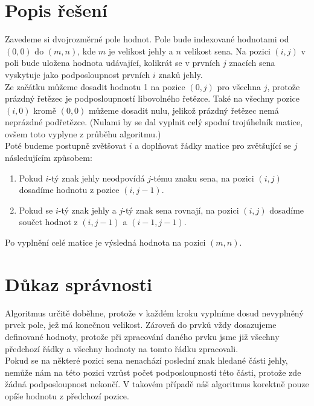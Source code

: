 \documentclass{scrartcl}
\begin{document}
    \section{Popis řešení}
    Zavedeme si dvojrozměrné pole hodnot. Pole bude indexované hodnotami od $(0, 0)$ do $(m, n)$, kde $m$ je velikost jehly a $n$ velikost sena. Na pozici $(i, j)$ v poli bude uložena hodnota udávající, kolikrát se v prvních $j$ znacích sena vyskytuje jako podposloupnost prvních $i$ znaků jehly. \\

    Ze začátku můžeme dosadit hodnotu 1 na pozice $(0, j)$ pro všechna $j$, protože prázdný řetězec je podposloupností libovolného řetězce. Také na všechny pozice $(i, 0)$ kromě $(0, 0)$ můžeme dosadit nulu, jelikož prázdný řetězec nemá neprázdné podřetězce. (Nulami by se dal vyplnit celý spodní trojúhelník matice, ovšem toto vyplyne z průběhu algoritmu.) \\

    Poté budeme postupně zvětšovat $i$ a doplňovat řádky matice pro zvětšující se $j$ následujícím způsobem:

    \begin{enumerate}
        \item Pokud $i$-tý znak jehly neodpovídá $j$-tému znaku sena, na pozici $(i,j)$ dosadíme hodnotu z pozice $(i, j-1)$.
        \item Pokud se $i$-tý znak jehly a $j$-tý znak sena rovnají, na pozici $(i, j)$ dosadíme součet hodnot z $(i, j-1)$ a $(i-1, j-1)$.
    \end{enumerate}

    Po vyplnění celé matice je výsledná hodnota na pozici $(m, n)$.

    \section{Důkaz správnosti}
    Algoritmus určitě doběhne, protože v každém kroku vyplníme dosud nevyplněný prvek pole, jež má konečnou velikost. Zároveň do prvků vždy dosazujeme definované hodnoty, protože při zpracování daného prvku jsme již všechny předchozí řádky a všechny hodnoty na tomto řádku zpracovali. \\

    Pokud se na některé pozici sena nenachází poslední znak hledané části jehly, nemůže nám na této pozici vzrůst počet podposloupností této části, protože zde žádná podposloupnost nekončí. V takovém případě náš algoritmus korektně pouze opíše hodnotu z předchozí pozice. \\
\end{document}
